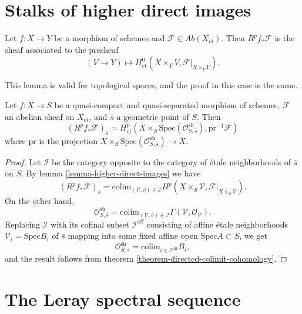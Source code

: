 \section{Stalks of higher direct images}
\label{section-stalks-direct-image}

\begin{lemma}
\label{lemma-higher-direct-images}
Let $f: X\to Y$ be a morphism of schemes and $\mathcal{F}\in
\textit{Ab}(X_{et})$. Then $R^pf_*\mathcal{F}$ is the sheaf associated to the
presheaf
$$
(V\to Y)\longmapsto H_{et}^0 \left(X\times_Y V,
\mathcal{F}|_{X\times_YV}\right).
$$
\end{lemma}

\noindent
This lemma is valid for topological spaces, and the proof in this case is the
same.

\begin{theorem}
\label{theorem-higher-direct-images}
Let $f: X\to S$ be a quasi-compact and quasi-separated morphism of schemes,
$\mathcal{F}$ an abelian sheaf on $X_{et}$, and $\bar s$ a geometric point of
$S$. Then
$$
\left(R^pf_* \mathcal{F}\right)_{\bar s} = H_{et}^p\left( X\times_S
\text{Spec}(\mathcal{O}_{S, \bar s}^\mathrm{sh}),
\text{pr}^{-1}\mathcal{F}\right)
$$
where $\text{pr}$ is the projection $X\times_S \text{Spec}(\mathcal{O}_{S,
\bar{s}}^\mathrm{sh}) \to X$.
\end{theorem}

\begin{proof}
Let $\mathcal{I}$ be the category opposite to the category of \'etale
neighborhoods of $\bar s$ on $S$. By lemma \ref{lemma-higher-direct-images}
we have
$$
\left(R^pf_*\mathcal{F}\right)_{\bar{s}} = \text{colim}_{(\mathcal{V},
\bar{v})\in \mathcal{I}} H^p(X\times_S\mathcal{V},
\mathcal{F}|_{X\times_S\mathcal{V}}).
$$
On the other hand,
$$
\mathcal{O}_{S, \bar{s}}^\mathrm{sh} = \text{colim}_{(\mathcal{V}, \bar v)\in
\mathcal{I}} \Gamma(\mathcal{V}, \mathcal{O}_\mathcal{V}).
$$
Replacing $\mathcal{I}$ with its cofinal subset $\mathcal{I}^\mathrm{aff}$
consisting of affine \'etale neighborhoods $\mathcal{V}_i= \text{Spec} B_i$ of
$\bar s$ mapping into some fixed affine open $\text{Spec} A \subset S$, we get
$$
\mathcal{O}_{S, \bar{s}}^\mathrm{sh} = \text{colim}_{i\in
\mathcal{I}^\mathrm{aff}} B_i,
$$
and the result follows from theorem \ref{theorem-directed-colimit-cohomology}.
\end{proof}





\section{The Leray spectral sequence}
\label{section-leray}


